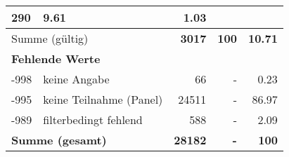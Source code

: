 \begin{longtable}{lXrrr}
       \num{290} &
       \num[round-mode=places,round-precision=2]{9,61} &
         \num[round-mode=places,round-precision=2]{1,03} \\
     \midrule
     \multicolumn{2}{l}{Summe (gültig)} &
       \textbf{\num{3017}} &
     \textbf{100} &
       \textbf{\num[round-mode=places,round-precision=2]{10,71}} \\
     \multicolumn{5}{l}{\textbf{Fehlende Werte}}\\
       -998 &
       keine Angabe &
         \num{66} &
        - &
         \num[round-mode=places,round-precision=2]{0,23} \\
       -995 &
       keine Teilnahme (Panel) &
         \num{24511} &
        - &
         \num[round-mode=places,round-precision=2]{86,97} \\
       -989 &
       filterbedingt fehlend &
         \num{588} &
        - &
         \num[round-mode=places,round-precision=2]{2,09} \\
     \midrule
     \multicolumn{2}{l}{\textbf{Summe (gesamt)}} &
          \textbf{\num{28182}} &
        \textbf{-} &
        \textbf{100} \\
     \bottomrule
     \end{longtable}
     
